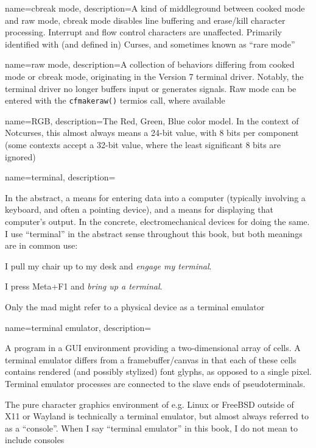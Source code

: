 {
  name={cbreak mode},
  description={A kind of middleground between \gls{cooked mode} and \gls{raw mode},
    cbreak mode disables line buffering and erase/kill character processing.
    Interrupt and flow control characters are unaffected. Primarily identified
    with (and defined in) Curses\cite{cursesosi}, and sometimes known as ``rare mode''}
}

{
  name={raw mode},
  description={A collection of behaviors differing from \gls{cooked mode} or
    \gls{cbreak mode},
   originating in the Version 7 terminal driver. Notably, the terminal driver no
   longer buffers input or generates signals. Raw mode can be entered with the
   \texttt{cfmakeraw()} termios call, where available}
}

{
  name={RGB},
  description={The Red, Green, Blue color model. In the context of Notcurses,
    this almost always means a 24-bit value, with 8 bits per component (some
    contexts accept a 32-bit value, where the least significant 8 bits are
    ignored)}
}

{
  name={terminal},
description={In the abstract, a means for entering data into a computer
  (typically involving a keyboard, and often a pointing device), and a means
  for displaying that computer's output. In the concrete, electromechanical
  devices for doing the same. I use ``terminal'' in the abstract sense
  throughout this book, but both meanings are in common use:

  \begin{denseitemize}
  \item I pull my chair up to my desk and \textit{engage my terminal}.
  \item I press Meta+F1 and \textit{bring up a terminal}.
  \end{denseitemize}

 Only the mad might refer to a physical device as a terminal emulator}
}

{
  name={terminal emulator},
description={A program in a GUI environment providing a
  two-dimensional array of cells. A terminal emulator differs from a
  framebuffer/canvas in that each of these cells contains rendered (and
  possibly stylized) font glyphs, as opposed to a single pixel. Terminal
  emulator processes are connected to the slave ends of pseudoterminals.

 The pure character graphics environment of e.g. Linux or FreeBSD outside
  of X11 or Wayland is technically a terminal emulator, but almost always
  referred to as a ``console''. When I say ``terminal emulator'' in this book,
  I do not mean to include consoles}
}

